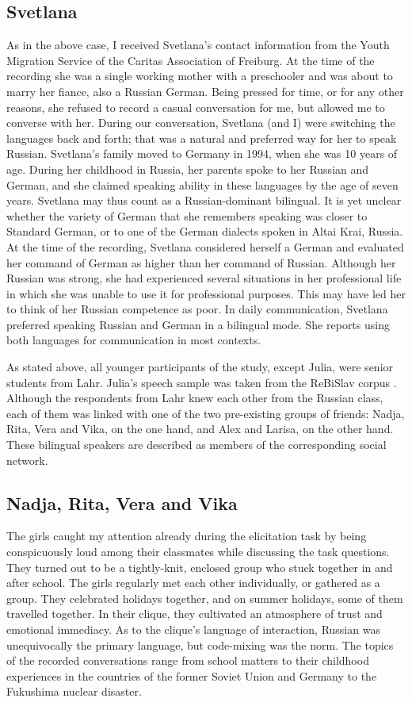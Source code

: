 \subsection{Svetlana}
As in the above case, I received Svetlana's contact information from the Youth Migration Service of the Caritas Association of Freiburg. At the time of the recording she was a single working mother with a preschooler and was about to marry her fiance, also a Russian German. Being pressed for time, or for any other reasons, she refused to record a casual conversation for me, but allowed me to converse with her. During our conversation, Svetlana (and I) were switching the languages back and forth; that was a natural and preferred way for her to speak Russian. Svetlana's family moved to Germany in 1994, when she was 10 years of age. During her childhood in Russia, her parents spoke to her Russian and German, and she claimed speaking ability in these languages by the age of seven years. Svetlana may thus count as a Russian-dominant bilingual. It is yet unclear whether the variety of German that she remembers speaking was closer to Standard German, or to one of the German dialects spoken in Altai Krai, Russia. At the time of the recording, Svetlana considered herself a German and evaluated her command of German as higher than her command of Russian. Although her Russian was strong, she had experienced several situations in her professional life in which she was unable to use it for professional purposes. This may have led her to think of her Russian competence as poor. In daily communication, Svetlana preferred speaking Russian and German in a bilingual mode. She reports using both languages for communication in most contexts.

As stated above, all younger participants of the study, except Julia, were senior students from Lahr. Julia's speech sample was taken from the ReBiSlav corpus \citep[cf.][]{rebislav}. Although the respondents from Lahr knew each other from the Russian class, each of them was linked with one of the two pre-existing groups of friends: Nadja, Rita, Vera and Vika, on the one hand, and Alex and Larisa, on the other hand. These bilingual speakers are described as members of the corresponding social network.

\subsection{Nadja, Rita, Vera and Vika}
The girls caught my attention already during the elicitation task by being conspicuously loud among their classmates while discussing the task questions. They turned out to be a tightly-knit, enclosed group who stuck together in and after school. The girls regularly met each other individually, or gathered as a group. They celebrated holidays together, and on summer holidays, some of them travelled together. In their clique, they  cultivated an atmosphere of trust and emotional immediacy. As to the clique's language of interaction, Russian was unequivocally the primary language, but code-mixing was the norm. The topics of the recorded conversations range from school matters to their childhood experiences in the countries of the former Soviet Union and Germany to the Fukushima nuclear disaster. 


